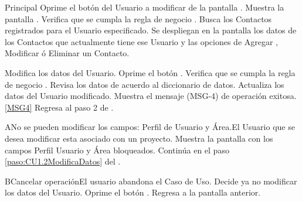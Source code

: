 	\begin{UCtrayectoria}{Principal}
			\UCpaso[\UCactor] Oprime el botón  del Usuario a modificar de la pantalla .
			\UCpaso Muestra la pantalla .
			\UCpaso Verifica que se cumpla la regla de negocio .  
			\UCpaso Busca los Contactos registrados para el Usuario especificado.\label{paso:CU2BuscarContactos}
			\UCpaso Se despliegan en la pantalla los datos de los Contactos que actualmente tiene ese Usuario y las opciones de Agregar , Modificar  ó Eliminar  un Contacto.  \label{PECU2}

     			\UCpaso [\UCactor] Modifica los datos del Usuario.\label{paso:CU1.2ModificaDatos}
			\UCpaso [\UCactor] Oprime el botón .
			\UCpaso Verifica que se cumpla la regla de negocio . 
			\UCpaso Revisa los datos de acuerdo al diccionario de datos. 
			\UCpaso Actualiza los datos del Usuario modificado.
			\UCpaso Muestra el mensaje (MSG-4) de operación exitosa.\ref{MSG4}
			\UCpaso Regresa al paso 2 de .
	\end{UCtrayectoria}

		\begin{UCtrayectoriaA}{A}{No se pueden modificar los campos: Perfil de Usuario y Área.}{El Usuario que se desea modificar esta asociado con un proyecto.}	
			\UCpaso Muestra la pantalla  con los campos Perfil Usuario y Área bloqueados.
			\UCpaso Continúa en el paso \ref{paso:CU1.2ModificaDatos} del .
		\end{UCtrayectoriaA}

		\begin{UCtrayectoriaA}{B}{Cancelar operación}{El usuario abandona el Caso de Uso.}
			\UCpaso[\UCactor] Decide ya no modificar los datos del Usuario.
			\UCpaso[\UCactor] Oprime el botón .
			\UCpaso Regresa a la pantalla anterior.
		\end{UCtrayectoriaA}

